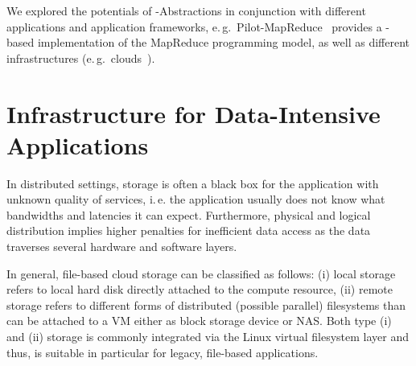 \documentclass{sig-alternate}
\begin{document}
We explored the potentials of \pilot-Abstractions in conjunction with
different applications and application frameworks, e.\,g.\
Pilot-MapReduce~\cite{Mantha:2012:PEF:2287016.2287020} provides a \pilot-based
implementation of the MapReduce programming model, as well as different 
infrastructures (e.\,g.\ clouds~\cite{pilotdata-cloud-2012}).


\section{Infrastructure for Data-Intensive Applications}

In distributed settings, storage is often a black box for the application with
unknown quality of services, i.\,e. the application usually does not know what
bandwidths and latencies it can expect. Furthermore, physical and logical
distribution implies higher penalties for inefficient data access as the data
traverses several hardware and software layers. 



In general, file-based cloud storage can be
classified as follows: (i) local storage refers to local hard disk
directly attached to the compute resource, (ii)
remote storage refers to different forms of distributed (possible
parallel) filesystems than can be attached to a VM either as block
storage device or NAS. Both type (i) and (ii) storage is commonly
integrated via the Linux virtual filesystem layer and thus, is
suitable in particular for legacy, file-based applications. 
\end{document}
